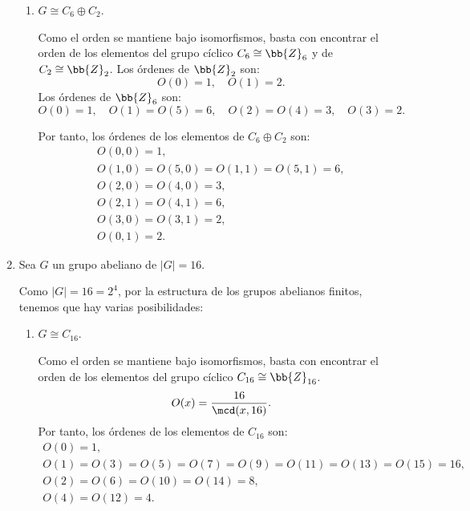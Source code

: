 \begin{ejercicio}
\begin{enumerate}
\begin{enumerate}
            
            \item $G \cong C_6 \oplus C_2$.
            
            Como el orden se mantiene bajo isomorfismos, basta con encontrar el orden de los elementos del grupo cíclico $C_6\cong \bb{Z}_6$ y de $C_2\cong \bb{Z}_2$.
            Los órdenes de $\bb{Z}_2$ son:
            \begin{equation*}
                O(0) = 1, \quad O(1) = 2.
            \end{equation*}
            Los órdenes de $\bb{Z}_6$ son:
            \begin{equation*}
                O(0) = 1, \quad O(1) = O(5) = 6, \quad O(2) = O(4) = 3, \quad O(3) = 2.
            \end{equation*}

            Por tanto, los órdenes de los elementos de $C_6 \oplus C_2$ son:
            \begin{gather*}
                O(0, 0) = 1, \\
                O(1, 0) = O(5, 0) = O(1, 1) = O(5, 1) = 6, \\
                O(2, 0) = O(4, 0) = 3, \\
                O(2, 1) = O(4, 1) = 6, \\
                O(3, 0) = O(3, 1) = 2, \\
                O(0, 1) = 2.
            \end{gather*}
            
        \end{enumerate}


        \item Sea $G$ un grupo abeliano de $|G| = 16$.
        
        Como $|G|=16=2^4$, por la estructura de los grupos abelianos finitos, tenemos que hay varias posibilidades:
        \begin{enumerate}
            \item $G \cong C_{16}$.
            
            Como el orden se mantiene bajo isomorfismos, basta con encontrar el orden de los elementos del grupo cíclico $C_{16}\cong \bb{Z}_{16}$.
            \begin{equation*}
                O(x) = \frac{16}{\mcd(x, 16)}.
            \end{equation*}
            Por tanto, los órdenes de los elementos de $C_{16}$ son:
            \begin{gather*}
                O(0) = 1, \\
                O(1) = O(3) = O(5) = O(7) = O(9) = O(11) = O(13) = O(15) = 16, \\
                O(2) = O(6) = O(10) = O(14) = 8, \\
                O(4) = O(12) = 4.
            \end{gather*}
            

\end{enumerate}
\end{enumerate}
\end{ejercicio}

